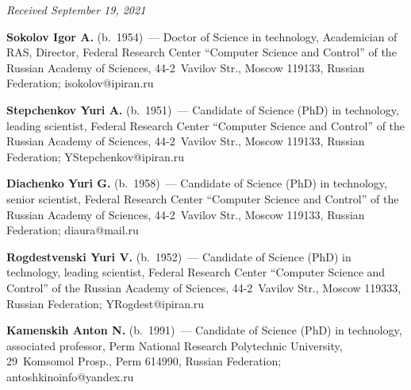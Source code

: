 \vspace*{-12pt}

\hfill{\small\textit{Received September 19, 2021}}

\pagebreak

\Contr

\noindent
\textbf{Sokolov Igor A.} (b.\ 1954)~--- Doctor of Science in technology, Academician of RAS, 
Director, Federal Research Center ``Computer Science and Control'' of the Russian Academy of 
Sciences, 44-2~Vavilov Str., Moscow 119133, Russian Federation; \mbox{isokolov@ipiran.ru}

\vspace*{3pt}

\noindent
\textbf{Stepchenkov Yuri A.} (b.\ 1951)~--- Candidate of Science (PhD) in technology, leading 
scientist, Federal Research Center ``Computer Science and Control'' of the Russian Academy of 
Sciences, 44-2~Vavilov Str., Moscow 119133, Russian Federation; 
\mbox{YStepchenkov@ipiran.ru}

\vspace*{3pt}

\noindent
\textbf{Diachenko Yuri G.} (b.\ 1958)~--- Candidate of Science (PhD) in technology, senior 
scientist, Federal Research Center ``Computer Science and Control'' of the Russian Academy of 
Sciences, 44-2~Vavilov Str., Moscow 119133, Russian Federation; \mbox{diaura@mail.ru}

\vspace*{3pt}

\noindent
\textbf{Rogdestvenski Yuri V.} (b.\ 1952)~--- Candidate of Science (PhD) in technology, leading 
scientist, Federal Research Center ``Computer Science and Control'' of the Russian Academy of 
Sciences, 44-2~Vavilov Str., Moscow 119333, Russian Federation;  \mbox{YRogdest@ipiran.ru}

\vspace*{3pt}

\noindent
\textbf{Kamenskih Anton N.} (b.\ 1991)~--- Candidate of Science (PhD) in technology, associated 
professor, Perm National Research Polytechnic University, 29~Komsomol Prosp., Perm 614990, 
Russian Federation; \mbox{antoshkinoinfo@yandex.ru}


  
\label{end\stat}

\renewcommand{\bibname}{\protect\rm Литература} 